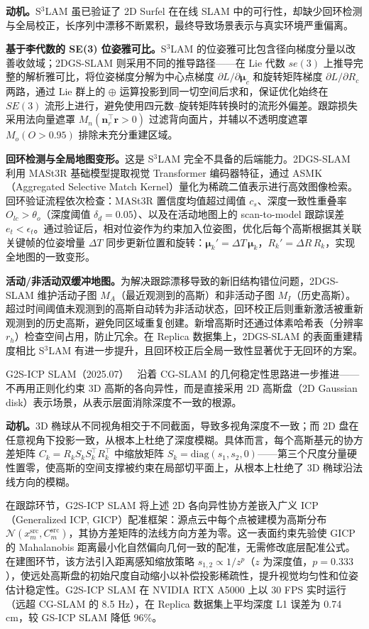 \textbf{动机。}S$^3$LAM 虽已验证了 2D Surfel 在在线 SLAM 中的可行性，却缺少回环检测与全局校正，长序列中漂移不断累积，最终导致场景表示与真实环境严重偏离。

\textbf{基于李代数的 SE(3) 位姿雅可比。}S$^3$LAM 的位姿雅可比包含径向梯度分量以改善收敛域；2DGS-SLAM 则采用不同的推导路径——在 Lie 代数 $se(3)$ 上推导完整的解析雅可比，将位姿梯度分解为中心点梯度 $\partial L / \partial \boldsymbol{\mu}_c$ 和旋转矩阵梯度 $\partial L / \partial R_c$ 两路，通过 Lie 群上的 $\oplus$ 运算投影到同一切空间后求和，保证优化始终在 $SE(3)$ 流形上进行，避免使用四元数--旋转矩阵转换时的流形外偏差。跟踪损失采用法向量遮罩 $M_n(\mathbf{n}_r^\top \mathbf{r} > 0)$ 过滤背向面片，并辅以不透明度遮罩 $M_o(O > 0.95)$ 排除未充分重建区域。

\textbf{回环检测与全局地图变形。}这是 S$^3$LAM 完全不具备的后端能力。2DGS-SLAM 利用 MASt3R 基础模型提取视觉 Transformer 编码器特征，通过 ASMK（Aggregated Selective Match Kernel）量化为稀疏二值表示进行高效图像检索。回环验证流程依次检查：MASt3R 置信度均值超过阈值 $c_s$、深度一致性重叠率 $O_{lc} > \theta_o$（深度阈值 $\delta_d = 0.05$）、以及在活动地图上的 scan-to-model 跟踪误差 $e_t < \epsilon_t$。通过验证后，相对位姿作为约束加入位姿图，优化后每个高斯根据其关联关键帧的位姿增量 $\Delta T$ 同步更新位置和旋转：$\boldsymbol{\mu}_k' = \Delta T \, \boldsymbol{\mu}_k$，$R_k' = \Delta R \, R_k$，实现全地图的一致变形。

\textbf{活动/非活动双缓冲地图。}为解决跟踪漂移导致的新旧结构错位问题，2DGS-SLAM 维护活动子图 $M_A$（最近观测到的高斯）和非活动子图 $M_I$（历史高斯）。超过时间阈值未观测到的高斯自动转为非活动状态，回环校正后则重新激活被重新观测到的历史高斯，避免同区域重复创建。新增高斯时还通过体素哈希表（分辨率 $r_h$）检查空间占用，防止冗余。在 Replica 数据集上，2DGS-SLAM 的表面重建精度相比 S$^3$LAM 有进一步提升，且回环校正后全局一致性显著优于无回环的方案。

G2S-ICP SLAM（2025.07）~\cite{2507_18344} 沿着 CG-SLAM 的几何稳定性思路进一步推进——不再用正则化约束 3D 高斯的各向异性，而是直接采用 2D 高斯盘（2D Gaussian disk）表示场景，从表示层面消除深度不一致的根源。

\textbf{动机。}3D 椭球从不同视角相交于不同截面，导致多视角深度不一致；而 2D 盘在任意视角下投影一致，从根本上杜绝了深度模糊。具体而言，每个高斯基元的协方差矩阵 $C_k = R_k S_k S_k^\top R_k^\top$ 中缩放矩阵 $S_k = \text{diag}(s_1, s_2, 0)$——第三个尺度分量硬性置零，使高斯的空间支撑被约束在局部切平面上，从根本上杜绝了 3D 椭球沿法线方向的模糊。

在跟踪环节，G2S-ICP SLAM 将上述 2D 各向异性协方差嵌入广义 ICP（Generalized ICP, GICP）配准框架：源点云中每个点被建模为高斯分布 $\mathcal{N}(x_m^\text{src}, C_m^\text{src})$，其协方差矩阵的法线方向方差为零。这一表面约束先验使 GICP 的 Mahalanobis 距离最小化自然偏向几何一致的配准，无需修改底层配准公式。在建图环节，该方法引入距离感知缩放策略 $s_{1,2} \propto 1/z^p$（$z$ 为深度值，$p=0.333$），使远处高斯盘的初始尺度自动缩小以补偿投影稀疏性，提升视觉均匀性和位姿估计稳定性。G2S-ICP SLAM 在 NVIDIA RTX A5000 上以 30 FPS 实时运行（远超 CG-SLAM 的 8.5 Hz），在 Replica 数据集上平均深度 L1 误差为 0.74 cm，较 GS-ICP SLAM 降低 96\%。

